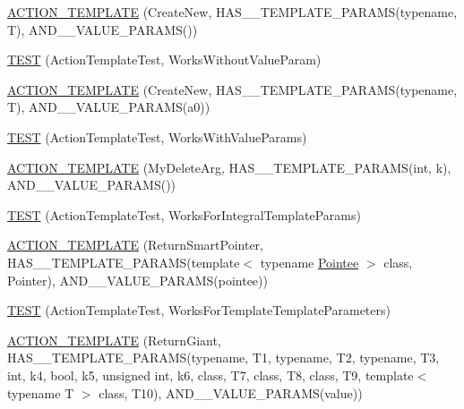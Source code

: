\begin{DoxyCompactItemize}
\item 
\hyperlink{namespacetesting_1_1gmock__generated__actions__test_a1debc0726715951fcd7f5443e436dc46}{A\+C\+T\+I\+O\+N\+\_\+\+T\+E\+M\+P\+L\+A\+TE} (Create\+New, H\+A\+S\+\_\+\_\+\+T\+E\+M\+P\+L\+A\+T\+E\+\_\+\+P\+A\+R\+A\+MS(typename, T), A\+N\+D\+\_\+\_\+\+V\+A\+L\+U\+E\+\_\+\+P\+A\+R\+A\+MS())
\item 
\hyperlink{namespacetesting_1_1gmock__generated__actions__test_aaac879cbe00638dcc2d4733760180a4f}{T\+E\+ST} (Action\+Template\+Test, Works\+Without\+Value\+Param)
\item 
\hyperlink{namespacetesting_1_1gmock__generated__actions__test_a38fb8047f95126bb0b2cfe7e670c8af7}{A\+C\+T\+I\+O\+N\+\_\+\+T\+E\+M\+P\+L\+A\+TE} (Create\+New, H\+A\+S\+\_\+\_\+\+T\+E\+M\+P\+L\+A\+T\+E\+\_\+\+P\+A\+R\+A\+MS(typename, T), A\+N\+D\+\_\+\_\+\+V\+A\+L\+U\+E\+\_\+\+P\+A\+R\+A\+MS(a0))
\item 
\hyperlink{namespacetesting_1_1gmock__generated__actions__test_a21f6e2ad5c4c1afecca93a42c9a84f1a}{T\+E\+ST} (Action\+Template\+Test, Works\+With\+Value\+Params)
\item 
\hyperlink{namespacetesting_1_1gmock__generated__actions__test_aaaac0fbf0bf2c7bd8fc104310e6af25c}{A\+C\+T\+I\+O\+N\+\_\+\+T\+E\+M\+P\+L\+A\+TE} (My\+Delete\+Arg, H\+A\+S\+\_\+\_\+\+T\+E\+M\+P\+L\+A\+T\+E\+\_\+\+P\+A\+R\+A\+MS(int, k), A\+N\+D\+\_\+\_\+\+V\+A\+L\+U\+E\+\_\+\+P\+A\+R\+A\+MS())
\item 
\hyperlink{namespacetesting_1_1gmock__generated__actions__test_aad8d77a35ac21f366dc334a45cf5b140}{T\+E\+ST} (Action\+Template\+Test, Works\+For\+Integral\+Template\+Params)
\item 
\hyperlink{namespacetesting_1_1gmock__generated__actions__test_ad99d926be507eb0c031538da2e8bb838}{A\+C\+T\+I\+O\+N\+\_\+\+T\+E\+M\+P\+L\+A\+TE} (Return\+Smart\+Pointer, H\+A\+S\+\_\+\_\+\+T\+E\+M\+P\+L\+A\+T\+E\+\_\+\+P\+A\+R\+A\+MS(template$<$ typename \hyperlink{namespacetesting_a5122ca3533f3a00f67e146dd81f3b68c}{Pointee} $>$ class, Pointer), A\+N\+D\+\_\+\_\+\+V\+A\+L\+U\+E\+\_\+\+P\+A\+R\+A\+MS(pointee))
\item 
\hyperlink{namespacetesting_1_1gmock__generated__actions__test_a8908d6badc9054adebdaf5ed8d455c2d}{T\+E\+ST} (Action\+Template\+Test, Works\+For\+Template\+Template\+Parameters)
\item 
\hyperlink{namespacetesting_1_1gmock__generated__actions__test_aea61dba8f93605f3e8c1cdedfd1079f5}{A\+C\+T\+I\+O\+N\+\_\+\+T\+E\+M\+P\+L\+A\+TE} (Return\+Giant, H\+A\+S\+\_\+\_\+\+T\+E\+M\+P\+L\+A\+T\+E\+\_\+\+P\+A\+R\+A\+MS(typename, T1, typename, T2, typename, T3, int, k4, bool, k5, unsigned int, k6, class, T7, class, T8, class, T9, template$<$ typename T $>$ class, T10), A\+N\+D\+\_\+\_\+\+V\+A\+L\+U\+E\+\_\+\+P\+A\+R\+A\+MS(value))

\end{DoxyCompactItemize}
